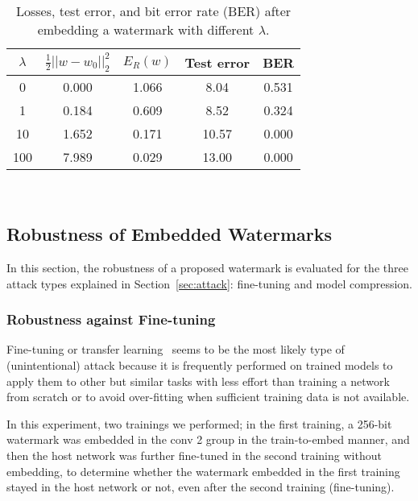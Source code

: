 \documentclass[10pt,twocolumn,letterpaper]{article}
\begin{document}
\begin{table}[tb]
	\centering
	\caption{Losses, test error, and bit error rate (BER) after embedding a watermark with different $\lambda$.}
	\label{tab:direct_embed}
\begin{tabular}{c|cccc} \hline
$\lambda$	& $\tfrac{1}{2} ||w - w_0||^2_2$	& $E_R (w)$	& Test error	& BER	\\ \hline
0			& 0.000								& 1.066		& 8.04			& 0.531	\\
1			& 0.184								& 0.609		& 8.52			& 0.324	\\
10			& 1.652								& 0.171		& 10.57			& 0.000	\\
100			& 7.989								& 0.029		& 13.00			& 0.000	\\ \hline
	\end{tabular} \\
\end{table}



\subsection{Robustness of Embedded Watermarks}
In this section, the robustness of a proposed watermark is evaluated for the three attack types explained in Section~\ref{sec:attack}: fine-tuning and model compression.

\subsubsection{Robustness against Fine-tuning}
Fine-tuning or transfer learning~\cite{Simonyan_iclr15} seems to be the most likely type of (unintentional) attack because it is frequently performed on trained models to apply them to other but similar tasks with less effort than training a network from scratch or to avoid over-fitting when sufficient training data is not available.

In this experiment, two trainings we performed; in the first training, a 256-bit watermark was embedded in the \textsf{conv 2} group in the train-to-embed manner, and then the host network was further fine-tuned in the second training without embedding, to determine whether the watermark embedded in the first training stayed in the host network or not, even after the second training (fine-tuning).
\end{document}
